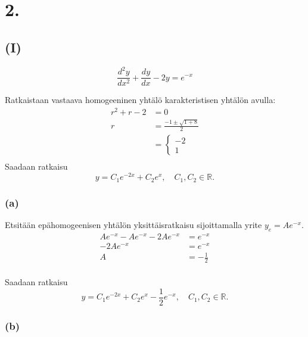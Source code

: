 \documentclass{article}
\begin{document}
\section*{2.}

\subsection*{(I)}

\[
  \frac{d^2 y}{d x^2} + \frac{dy}{dx} - 2y = e^{-x}
\]

Ratkaistaan vastaava homogeeninen yhtälö karakteristisen yhtälön avulla:
\begin{align*}
  r^2 + r - 2 &= 0 \\
  r &= \frac{-1 \pm \sqrt{1 + 8}}{2} \\
    &= \begin{cases} -2 \\ 1 \end{cases} \\
\end{align*}
Saadaan ratkaisu
\[
  y = C_1e^{-2x} + C_2e^{x}, \quad C_1,C_2 \in \mathbb{R}.
\]

\subsubsection*{(a)}

Etsitään epähomogeenisen yhtälön yksittäisratkaisu sijoittamalla yrite
$y_e = Ae^{-x}$.
\begin{align*}
  Ae^{-x} - Ae^{-x} - 2Ae^{-x} &= e^{-x} \\
  -2Ae^{-x} &= e^{-x} \\
  A &= -\frac{1}{2} \\
\end{align*}

Saadaan ratkaisu
\[
  y = C_1e^{-2x} + C_2e^{x} - \frac{1}{2}e^{-x}, \quad C_1,C_2 \in \mathbb{R}.
\]

\subsubsection*{(b)}
\end{document}
